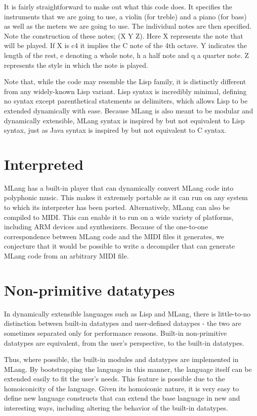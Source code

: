 \documentclass{article}
\begin{document}
It is fairly straightforward to make out what this code does. It specifies the instruments that we are going to use, a violin (for treble) and a piano (for bass) as well as the meters we are going to use. The individual notes are then specified. Note the construction of these notes; (X Y Z). Here X represents the note that will be played. If X is c4 it implies the C note of the 4th octave. Y indicates the length of the rest, e denoting a whole note, h a half note and q a quarter note. Z represents the style in which the note is played.\newline


Note that, while the code may resemble the Lisp family, it is distinctly different from any widely-known Lisp variant. Lisp syntax is incredibly minimal, defining no syntax except parenthetical statements as delimiters, which allows Lisp to be extended dynamically with ease. Because MLang is also meant to be modular and dynamically extensible, MLang syntax is inspired by but not equivalent to Lisp syntax, just as Java syntax is inspired by but not equivalent to C syntax.


\section{Interpreted}


MLang has a built-in player that can dynamically convert MLang code into polyphonic music. This makes it extremely portable as it can run on any system to which its interpreter has been ported. Alternatively, MLang can also be compiled to MIDI. This can enable it to run on a wide variety of platforms, including ARM devices and synthesizers. Because of the one-to-one correspondence between MLang code and the MIDI files it generates, we conjecture that it would be possible to write a decompiler that can generate MLang code from an arbitrary MIDI file.

\section{Non-primitive datatypes}


In dynamically extensible languages such as Lisp and MLang, there is little-to-no distinction between built-in datatypes and user-defined dataypes - the two are sometimes separated only for performance reasons. Built-in non-primitive datatypes are equivalent, from the user’s perspective, to the built-in datatypes.


Thus, where possible, the built-in modules and datatypes are implemented in MLang. By bootstrapping the language in this manner, the language itself can be extended easily to fit the user’s needs. This feature is possible due to the homoiconicity of the language. Given its homoiconic nature, it is very easy to define new language constructs that can extend the base language in new and interesting ways, including altering the behavior of the built-in datatypes. 
\end{document}
